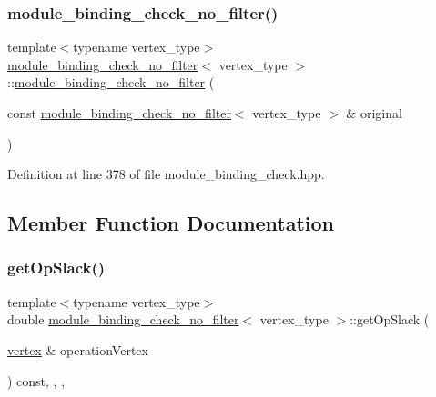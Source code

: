 \subsubsection{\texorpdfstring{module\+\_\+binding\+\_\+check\+\_\+no\+\_\+filter()}{module\_binding\_check\_no\_filter()}\hspace{0.1cm}{\footnotesize\ttfamily [2/2]}}
{\footnotesize\ttfamily template$<$typename vertex\+\_\+type$>$ \\
\hyperlink{structmodule__binding__check__no__filter}{module\+\_\+binding\+\_\+check\+\_\+no\+\_\+filter}$<$ vertex\+\_\+type $>$\+::\hyperlink{structmodule__binding__check__no__filter}{module\+\_\+binding\+\_\+check\+\_\+no\+\_\+filter} (\begin{DoxyParamCaption}\item[{const \hyperlink{structmodule__binding__check__no__filter}{module\+\_\+binding\+\_\+check\+\_\+no\+\_\+filter}$<$ vertex\+\_\+type $>$ \&}]{original }\end{DoxyParamCaption})\hspace{0.3cm}{\ttfamily [inline]}}



Definition at line 378 of file module\+\_\+binding\+\_\+check.\+hpp.



\subsection{Member Function Documentation}
\mbox{\label{structmodule__binding__check__no__filter_a13a56954ea41ba112ee9d4ad3f709ed8}} 
\subsubsection{\texorpdfstring{get\+Op\+Slack()}{getOpSlack()}}
{\footnotesize\ttfamily template$<$typename vertex\+\_\+type$>$ \\
double \hyperlink{structmodule__binding__check__no__filter}{module\+\_\+binding\+\_\+check\+\_\+no\+\_\+filter}$<$ vertex\+\_\+type $>$\+::get\+Op\+Slack (\begin{DoxyParamCaption}\item[{\hyperlink{graph_8hpp_abefdcf0544e601805af44eca032cca14}{vertex} \&}]{operation\+Vertex }\end{DoxyParamCaption}) const\hspace{0.3cm}{\ttfamily [inline]}, {\ttfamily [override]}, {\ttfamily [protected]}, {\ttfamily [virtual]}}



